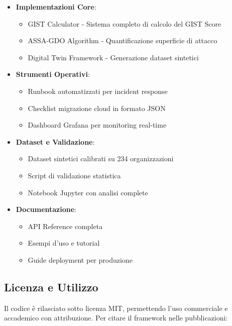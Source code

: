 \begin{itemize}
    \item \textbf{Implementazioni Core}:
    \begin{itemize}
        \item GIST Calculator - Sistema completo di calcolo del GIST Score
        \item ASSA-GDO Algorithm - Quantificazione superficie di attacco
        \item Digital Twin Framework - Generazione dataset sintetici
    \end{itemize}

    \item \textbf{Strumenti Operativi}:
    \begin{itemize}
        \item Runbook automatizzati per incident response
        \item Checklist migrazione cloud in formato JSON
        \item Dashboard Grafana per monitoring real-time
    \end{itemize}

    \item \textbf{Dataset e Validazione}:
    \begin{itemize}
        \item Dataset sintetici calibrati su 234 organizzazioni
        \item Script di validazione statistica
        \item Notebook Jupyter con analisi complete
    \end{itemize}

    \item \textbf{Documentazione}:
    \begin{itemize}
        \item API Reference completa
        \item Esempi d'uso e tutorial
        \item Guide deployment per produzione
    \end{itemize}
\end{itemize}

\subsection*{Licenza e Utilizzo}

Il codice è rilasciato sotto licenza MIT, permettendo l'uso commerciale e accademico con attribuzione. Per citare il framework nelle pubblicazioni:

